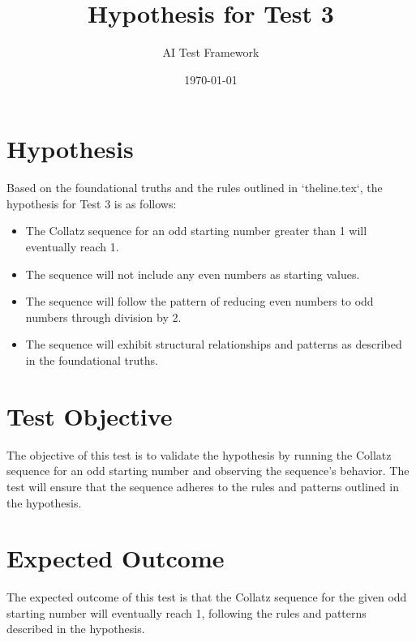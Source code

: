 \documentclass[11pt]{article}
\title{\textbf{Hypothesis for Test 3}}
\author{AI Test Framework}
\date{\today}
\begin{document}
\maketitle

\section*{\textbf{Hypothesis}}

Based on the foundational truths and the rules outlined in `theline.tex`, the hypothesis for Test 3 is as follows:

\begin{itemize}
    \item The Collatz sequence for an odd starting number greater than 1 will eventually reach 1.
    \item The sequence will not include any even numbers as starting values.
    \item The sequence will follow the pattern of reducing even numbers to odd numbers through division by 2.
    \item The sequence will exhibit structural relationships and patterns as described in the foundational truths.
\end{itemize}

\section*{\textbf{Test Objective}}

The objective of this test is to validate the hypothesis by running the Collatz sequence for an odd starting number and observing the sequence's behavior. The test will ensure that the sequence adheres to the rules and patterns outlined in the hypothesis.

\section*{\textbf{Expected Outcome}}

The expected outcome of this test is that the Collatz sequence for the given odd starting number will eventually reach 1, following the rules and patterns described in the hypothesis.
\end{document}
